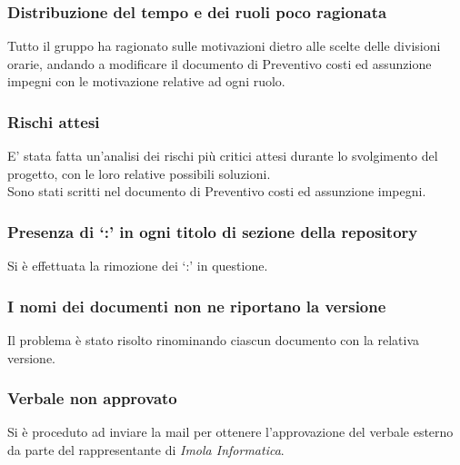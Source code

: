 \documentclass[a4paper, 11pt]{article}
\begin{document}
\subsubsection{Distribuzione del tempo e dei ruoli poco ragionata}

Tutto il gruppo ha ragionato sulle motivazioni dietro alle scelte delle divisioni orarie, andando a modificare il documento di Preventivo costi ed assunzione impegni con le motivazione relative ad ogni ruolo. 

\subsubsection{Rischi attesi}
E' stata fatta un'analisi dei rischi più critici attesi durante lo svolgimento del progetto, con le loro relative possibili soluzioni.\\
Sono stati scritti nel documento di Preventivo costi ed assunzione impegni. 

\subsubsection{Presenza di ‘:’ in ogni titolo di sezione della repository}

Si è effettuata la rimozione dei ‘:’ in questione. 

\subsubsection{I nomi dei documenti non ne riportano la versione}

Il problema è stato risolto rinominando ciascun documento con la relativa versione. 

\subsubsection{Verbale non approvato}

Si è proceduto ad inviare la mail per ottenere l'approvazione del verbale esterno da parte del rappresentante di \textit{Imola Informatica}.
\end{document}

